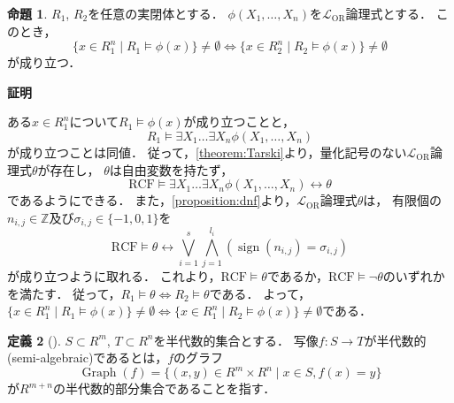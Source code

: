 \documentclass[uplatex, dvipdfmx]{jsarticle}
\makeatletter
\numberwithin{equation}{section}
\renewenvironment{proof}[1][\proofname]{\par
  \pushQED{\qed}%
  \normalfont \topsep6\p@\@plus6\p@\relax
  \trivlist
  \item\relax
  {\bfseries
  #1\@addpunct{.}}\hspace\labelsep\ignorespaces
}{
  \popQED\endtrivlist\@endpefalse
}
\newcommand{\Z}{\mathbb{Z}}
\newcommand{\RCF}{\mathrm{RCF}}
\newcommand{\map}[3]{{#1}\colon{#2}\rightarrow{#3}}
\DeclareMathOperator{\sign}{sign}
\DeclareMathOperator{\Graph}{Graph}
\theoremstyle{definition}
\newtheorem{definition}{定義}[section]
\newtheorem{proposition}[definition]{命題}
\renewcommand{\proofname}{\textbf{証明}}
\makeatother
\begin{document}
\begin{proposition}\label{proposition:Artin-Lang}
     $R_1$, $R_2$を任意の実閉体とする．
     $\phi(X_1, \dots, X_n)$を$\mathcal{L}_\mathrm{OR}$論理式とする．
     このとき，
     \begin{equation}
          \{x \in R_1^n \mid R_1 \models \phi(x)\} \neq \emptyset \iff
          \{x \in R_2^n \mid R_2 \models \phi(x)\} \neq \emptyset
     \end{equation}
     が成り立つ．
\end{proposition}
\begin{proof}
     ある$x \in R_1^n$について$R_1 \models \phi(x)$が成り立つことと，
     \begin{equation}
          R_1 \models \exists X_1 \dots \exists X_n \phi(X_1, \dots, X_n)
     \end{equation}
     が成り立つことは同値．
     従って，\cref{theorem:Tarski}より，量化記号のない$\mathcal{L}_\mathrm{OR}$論理式$\theta$が存在し，
     $\theta$は自由変数を持たず，
     \begin{equation}
          \RCF \models \exists X_1 \dots \exists X_n \phi(X_1, \dots, X_n) \leftrightarrow \theta
     \end{equation}
     であるようにできる．
     また，\cref{proposition:dnf}より，$\mathcal{L}_\mathrm{OR}$論理式$\theta$は，
     有限個の$n_{i,j} \in \Z$及び$\sigma_{i,j} \in \{-1, 0, 1\}$を
     \begin{equation}
          \RCF \models \theta \leftrightarrow \bigvee_{i=1}^s \bigwedge_{j=1}^{l_i} (\sign(n_{i,j}) = \sigma_{i,j})
     \end{equation}
     が成り立つように取れる．
     これより，$\RCF \models \theta$であるか，$\RCF \models \lnot \theta$のいずれかを満たす．
     従って，$R_1 \models \theta \iff R_2 \models \theta$である． 
     よって，$\{x \in R_1^n \mid R_1 \models \phi(x)\} \neq \emptyset \iff \{x \in R_1^n \mid R_2 \models \phi(x)\} \neq \emptyset$である．
\end{proof}

\begin{definition}[{\cite[Definition 2.2.5]{MR1659509}}]
     $S \subset R^m$, $T \subset R^n$を半代数的集合とする．
     写像$\map{f}{S}{T}$が半代数的(semi-algebraic)であるとは，$f$のグラフ
     \begin{equation}
          \Graph(f) = \{(x, y) \in R^m \times R^n \mid x \in S, f(x) = y\}
     \end{equation}
     が$R^{m+n}$の半代数的部分集合であることを指す．
\end{definition}
\end{document}
